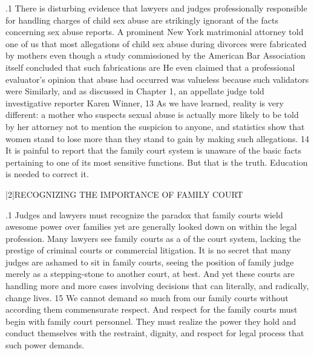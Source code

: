 \documentclass[11pt, twoside]{article}
\begin{document}
{\p.1{%
There is disturbing evidence that lawyers and judges professionally responsible for handling charges of child sex abuse are strikingly ignorant
of the facts concerning sex abuse reports. A prominent New York matrimonial attorney told one of us that most allegations of child sex abuse
during divorces were fabricated by mothers \mdash{}even though a study commissioned by the American Bar Association
itself concluded that such fabrications are  He even claimed that a
professional evaluator’s opinion that abuse had occurred was valueless
because such validators were  Similarly, and as discussed in Chapter 1, an appellate judge told investigative
reporter Karen Winner,  13 As we have learned, reality is very different: a mother who
suspects sexual abuse is actually more likely to be told by her attorney
not to mention the suspicion to anyone, and statistics show that women
stand to lose more than they stand to gain by making such allegations. 14
It is painful to report that the family court system is unaware of the basic facts pertaining to one of its most sensitive functions. But that is the
truth. Education is needed to correct it.
}%


\s|2|{RECOGNIZING THE IMPORTANCE OF FAMILY COURT}

\p.1{%
\noindent{}Judges and lawyers must recognize the paradox that family courts wield
awesome power over families yet are generally looked down on within
the legal profession. Many lawyers see family courts as a  of
the court system, lacking the prestige of criminal courts or commercial
litigation. It is no secret that many judges are ashamed to sit in family
courts, seeing the position of family judge merely as a stepping-stone to
another court, at best. And yet these courts are handling more and more
cases involving decisions that can literally, and radically, change lives. 15
We cannot demand so much from our family courts without according
them commensurate respect. And respect for the family courts must
begin with family court personnel. They must realize the power they
hold and conduct themselves with the restraint, dignity, and respect for
legal process that such power demands.
}%


}
\end{document}

